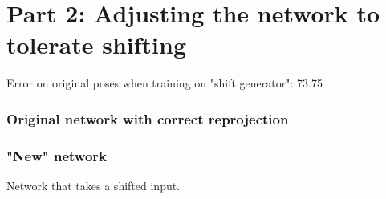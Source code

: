 \section{Part 2: Adjusting the network to tolerate shifting}
\label{sec:network-adjusting}
Error on original poses when training on "shift generator": 73.75
\subsubsection{Original network with correct reprojection}

\subsubsection{"New" network}
Network that takes a shifted input.